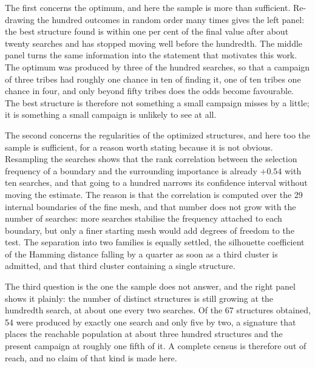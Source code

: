 \documentclass{style/nseJournal}
\begin{document}
The first concerns the optimum, and here the sample is more than sufficient.
Re-drawing the hundred outcomes in random order many times gives the left panel:
the best structure found is within one per cent of the final value after about
twenty searches and has stopped moving well before the hundredth. The middle
panel turns the same information into the statement that motivates this work.
The optimum was produced by three of the hundred searches, so that a campaign of
three tribes had roughly one chance in ten of finding it, one of ten tribes one
chance in four, and only beyond fifty tribes does the odds become favourable.
The best structure is therefore not something a small campaign misses by a
little; it is something a small campaign is unlikely to see at all.

The second concerns the regularities of the optimized structures, and here too
the sample is sufficient, for a reason worth stating because it is not obvious.
Resampling the searches shows that the rank correlation between the selection
frequency of a boundary and the surrounding importance is already $+0.54$ with
ten searches, and that going to a hundred narrows its confidence interval
without moving the estimate. The reason is that the correlation is computed over
the 29 internal boundaries of the fine mesh, and that number does not grow with
the number of searches: more searches stabilise the frequency attached to each
boundary, but only a finer starting mesh would add degrees of freedom to the
test. The separation into two families is equally settled, the silhouette
coefficient of the Hamming distance falling by a quarter as soon as a third
cluster is admitted, and that third cluster containing a single structure.

The third question is the one the sample does not answer, and the right panel
shows it plainly: the number of distinct structures is still growing at the
hundredth search, at about one every two searches. Of the 67 structures obtained,
54 were produced by exactly one search and only five by two, a signature that
places the reachable population at about three hundred structures and the
present campaign at roughly one fifth of it. A complete census is therefore out
of reach, and no claim of that kind is made here.
\end{document}
